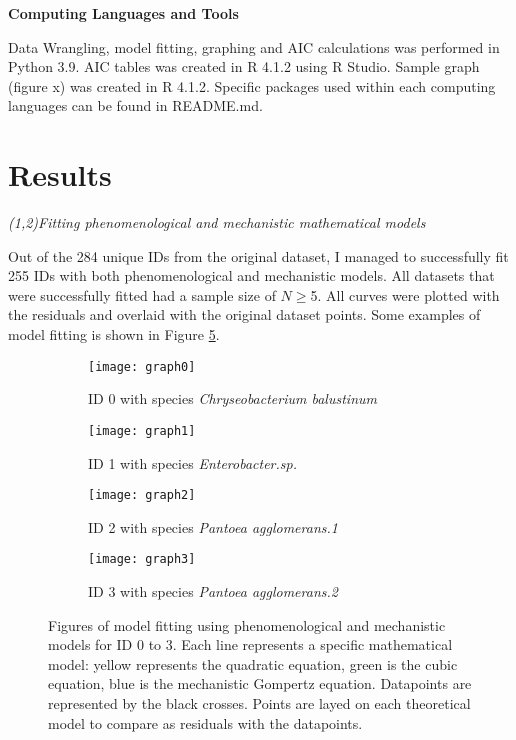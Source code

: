 \documentclass[11pt]{article}
\begin{document}
\noindent\textbf{Computing Languages and Tools}

Data Wrangling, model fitting, graphing and AIC calculations was performed in Python 3.9. AIC tables was created in R 4.1.2 
using R Studio. Sample graph (figure x) was created in R 4.1.2. Specific packages used within each computing languages can 
be found in README.md.

\section{Results}

\noindent\emph{(1,2)Fitting phenomenological and mechanistic mathematical models}

Out of the 284 unique IDs from the original dataset, I managed to successfully fit 255 IDs with both phenomenological and mechanistic
models. All datasets that were successfully fitted had a sample size of $N\geq$5. All curves were plotted with the residuals and 
overlaid with the original dataset points. Some examples of model fitting is shown in Figure \ref{fig:fig2}.

\begin{figure}[ht]
    \begin{subfigure}[b]{0.5\linewidth}
        \centering
        \texttt{[image: graph0]}
        \caption{ID 0 with species \emph{Chryseobacterium balustinum} \cite{bae_growth_2014}}
        \label{fig2:a}
        \vspace{4ex}
    \end{subfigure}%
    \begin{subfigure}[b]{0.5\linewidth}
        \centering
        \texttt{[image: graph1]}
        \caption{ID 1 with species \emph{Enterobacter.sp.} \cite{bae_growth_2014}}
        \label{fig2:b}
        \vspace{4ex}
    \end{subfigure}
    \begin{subfigure}[b]{0.5\linewidth}
        \centering
        \texttt{[image: graph2]}
        \caption{ID 2 with species \emph{Pantoea agglomerans.1} \cite{bae_growth_2014}}
        \label{fig2:c}
        \vspace{4ex}
    \end{subfigure}%
    \begin{subfigure}[b]{0.5\linewidth}
        \centering
        \texttt{[image: graph3]}
        \caption{ID 3 with species \emph{Pantoea agglomerans.2} \cite{bae_growth_2014}}
        \label{fig2:d}
        \vspace{4ex}  
    \end{subfigure}
    \caption{Figures of model fitting using phenomenological and mechanistic models for ID 0 to 3. Each line represents a specific mathematical model: yellow represents the quadratic equation,
    green is the cubic equation, blue is the mechanistic Gompertz equation. Datapoints are represented by the black crosses. Points are layed on each theoretical model to compare as residuals with the datapoints.}
    \label{fig:fig2}
\end{figure}
\end{document}
